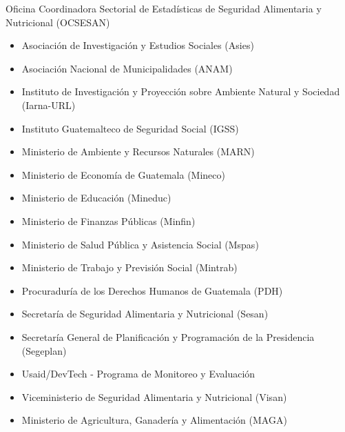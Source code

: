 


\clearpage

$\ $
\vspace{1cm}

\begin{center}
	{\Bold \LARGE Oficina Coordinadora Sectorial de Estadísticas de Seguridad Alimentaria y Nutricional (OCSESAN)}\\[2cm]
	
\begin{itemize}
	\item Asociación de Investigación y Estudios Sociales (Asies)
	\item 	Asociación Nacional de Municipalidades (ANAM)
	\item 	Instituto de Investigación y Proyección sobre Ambiente Natural y Sociedad  (Iarna-URL)
	\item 	Instituto Guatemalteco de Seguridad Social (IGSS)
	\item 	Ministerio de Ambiente y Recursos Naturales (MARN)
	\item 	Ministerio de Economía de Guatemala (Mineco)
	\item 	Ministerio de Educación (Mineduc)
	\item 	Ministerio de Finanzas Públicas (Minfin)
	\item 	Ministerio de Salud Pública y Asistencia Social (Mspas)
	\item 	Ministerio de Trabajo y Previsión Social (Mintrab)
	\item 	Procuraduría de los Derechos Humanos de Guatemala (PDH)
	\item 	Secretaría de Seguridad Alimentaria y Nutricional (Sesan)
	\item 	Secretaría General de Planificación y Programación de la Presidencia (Segeplan)
	\item 	Usaid/DevTech - Programa de Monitoreo y Evaluación
	\item 	Viceministerio de Seguridad Alimentaria y Nutricional (Visan)
	\item 	Ministerio de Agricultura, Ganadería y Alimentación (MAGA)
\end{itemize}	

\end{center}\cleardoublepage




\clearpage

$\ $
\vspace{1cm}

